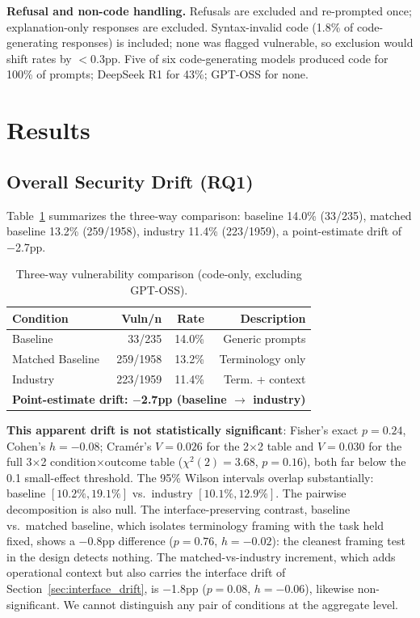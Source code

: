 \documentclass[sigconf,review,anonymous]{acmart}
\begin{document}
\textbf{Refusal and non-code handling.} Refusals are excluded and re-prompted once; explanation-only responses are excluded. Syntax-invalid code (1.8\% of code-generating responses) is included; none was flagged vulnerable, so exclusion would shift rates by $<$0.3pp. Five of six code-generating models produced code for 100\% of prompts; DeepSeek R1 for 43\%; GPT-OSS for none.

\section{Results}

\subsection{Overall Security Drift (RQ1)}

Table~\ref{tab:overall} summarizes the three-way comparison: baseline 14.0\% (33/235), matched baseline 13.2\% (259/1958), industry 11.4\% (223/1959), a point-estimate drift of $-$2.7pp.

\begin{table}[t]
\caption{Three-way vulnerability comparison (code-only, excluding GPT-OSS).}
\label{tab:overall}
\centering
\footnotesize
\begin{tabular}{lrrr}
\toprule
\textbf{Condition} & \textbf{Vuln/n} & \textbf{Rate} & \textbf{Description} \\
\midrule
Baseline & 33/235 & 14.0\% & Generic prompts \\
Matched Baseline & 259/1958 & 13.2\% & Terminology only \\
Industry & 223/1959 & 11.4\% & Term. + context \\
\midrule
\multicolumn{4}{l}{\textbf{Point-estimate drift: $-$2.7pp (baseline $\rightarrow$ industry)}} \\
\bottomrule
\end{tabular}
\end{table}

\textbf{This apparent drift is not statistically significant}: Fisher's exact $p = 0.24$, Cohen's $h = -0.08$; Cram\'er's $V = 0.026$ for the 2$\times$2 table and $V = 0.030$ for the full 3$\times$2 condition$\times$outcome table ($\chi^2(2) = 3.68$, $p = 0.16$), both far below the 0.1 small-effect threshold. The 95\% Wilson intervals overlap substantially: baseline $[10.2\%, 19.1\%]$ vs.\ industry $[10.1\%, 12.9\%]$. The pairwise decomposition is also null. The interface-preserving contrast, baseline vs.\ matched baseline, which isolates terminology framing with the task held fixed, shows a $-$0.8pp difference ($p = 0.76$, $h = -0.02$): the cleanest framing test in the design detects nothing. The matched-vs-industry increment, which adds operational context but also carries the interface drift of Section~\ref{sec:interface_drift}, is $-$1.8pp ($p = 0.08$, $h = -0.06$), likewise non-significant. We cannot distinguish any pair of conditions at the aggregate level.
\end{document}
